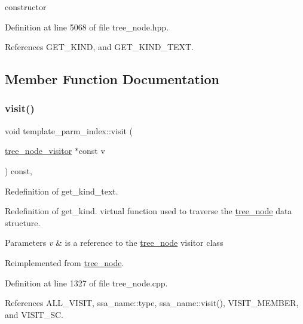 constructor 



Definition at line 5068 of file tree\+\_\+node.\+hpp.



References G\+E\+T\+\_\+\+K\+I\+ND, and G\+E\+T\+\_\+\+K\+I\+N\+D\+\_\+\+T\+E\+XT.



\subsection{Member Function Documentation}
\mbox{\label{structtemplate__parm__index_a93264afe632fd02f7c454a429036064e}} 
\subsubsection{\texorpdfstring{visit()}{visit()}}
{\footnotesize\ttfamily void template\+\_\+parm\+\_\+index\+::visit (\begin{DoxyParamCaption}\item[{\hyperlink{classtree__node__visitor}{tree\+\_\+node\+\_\+visitor} $\ast$const}]{v }\end{DoxyParamCaption}) const\hspace{0.3cm}{\ttfamily [override]}, {\ttfamily [virtual]}}



Redefinition of get\+\_\+kind\+\_\+text. 

Redefinition of get\+\_\+kind. virtual function used to traverse the \hyperlink{classtree__node}{tree\+\_\+node} data structure. 
\begin{DoxyParams}{Parameters}
{\em v} & is a reference to the \hyperlink{classtree__node}{tree\+\_\+node} visitor class \\
\hline
\end{DoxyParams}


Reimplemented from \hyperlink{classtree__node_aa9abba3f1b30e0be80b4a56b188c6ecc}{tree\+\_\+node}.



Definition at line 1327 of file tree\+\_\+node.\+cpp.



References A\+L\+L\+\_\+\+V\+I\+S\+IT, ssa\+\_\+name\+::type, ssa\+\_\+name\+::visit(), V\+I\+S\+I\+T\+\_\+\+M\+E\+M\+B\+ER, and V\+I\+S\+I\+T\+\_\+\+SC.

